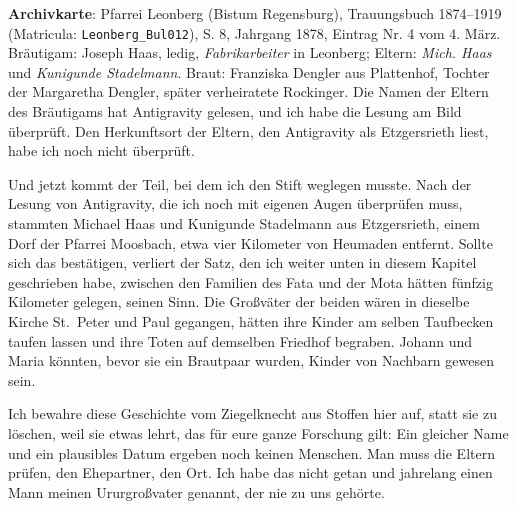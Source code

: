 \documentclass[
  ngerman,
  11pt,
  openany]{book}
\begin{document}
\begin{ficha}

\textbf{Archivkarte}: Pfarrei Leonberg (Bistum Regensburg), Trauungsbuch
1874--1919 (Matricula: \texttt{Leonberg\_Bul012}), S. 8, Jahrgang 1878,
Eintrag Nr. 4 vom 4. März. Bräutigam: Joseph Haas, ledig,
\emph{Fabrikarbeiter} in Leonberg; Eltern: \emph{Mich. Haas} und
\emph{Kunigunde Stadelmann}. Braut: Franziska Dengler aus Plattenhof,
Tochter der Margaretha Dengler, später verheiratete Rockinger. Die Namen
der Eltern des Bräutigams hat Antigravity gelesen, und ich habe die
Lesung am Bild überprüft. Den Herkunftsort der Eltern, den Antigravity
als Etzgersrieth liest, habe ich noch nicht überprüft.

\end{ficha}

Und jetzt kommt der Teil, bei dem ich den Stift weglegen musste. Nach
der Lesung von Antigravity, die ich noch mit eigenen Augen überprüfen
muss, stammten Michael Haas und Kunigunde Stadelmann aus Etzgersrieth,
einem Dorf der Pfarrei Moosbach, etwa vier Kilometer von Heumaden
entfernt. Sollte sich das bestätigen, verliert der Satz, den ich weiter
unten in diesem Kapitel geschrieben habe, zwischen den Familien des Fata
und der Mota hätten fünfzig Kilometer gelegen, seinen Sinn. Die
Großväter der beiden wären in dieselbe Kirche St.~Peter und Paul
gegangen, hätten ihre Kinder am selben Taufbecken taufen lassen und ihre
Toten auf demselben Friedhof begraben. Johann und Maria könnten, bevor
sie ein Brautpaar wurden, Kinder von Nachbarn gewesen sein.

Ich bewahre diese Geschichte vom Ziegelknecht aus Stoffen hier auf,
statt sie zu löschen, weil sie etwas lehrt, das für eure ganze Forschung
gilt: Ein gleicher Name und ein plausibles Datum ergeben noch keinen
Menschen. Man muss die Eltern prüfen, den Ehepartner, den Ort. Ich habe
das nicht getan und jahrelang einen Mann meinen Ururgroßvater genannt,
der nie zu uns gehörte.
\end{document}
